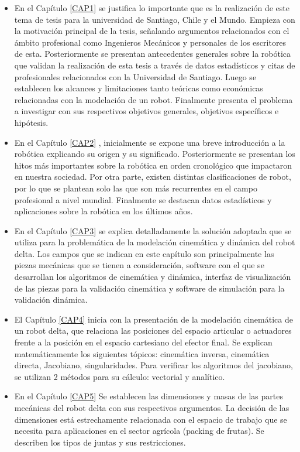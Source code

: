 \begin{itemize}
    \item {En el Capítulo \eqref{CAP1} se justifica lo importante que es la realización de este tema de tesis para la universidad de Santiago, Chile y el Mundo. Empieza con la motivación principal de la tesis, señalando argumentos relacionados con el ámbito profesional como Ingenieros Mecánicos y personales de los escritores de esta. Posteriormente se presentan antecedentes generales sobre la robótica que validan la realización de esta tesis a través de datos estadísticos y citas de profesionales relacionados con la Universidad de Santiago. Luego se establecen los alcances y limitaciones tanto teóricas como económicas relacionadas con la modelación de un robot. Finalmente presenta el problema a investigar con sus respectivos objetivos generales, objetivos específicos e hipótesis.}
    \item {En el Capítulo \eqref{CAP2} , inicialmente se expone una breve introducción a la robótica explicando su origen y su significado. Posteriormente se presentan los hitos más importantes sobre la robótica en orden cronológico que impactaron en nuestra sociedad. Por otra parte, existen distintas clasificaciones de robot, por lo que se plantean solo las que son más recurrentes en el campo profesional a nivel mundial. Finalmente se destacan datos estadísticos y aplicaciones sobre la robótica en los últimos años.}
    \item {En el Capítulo \eqref{CAP3} se explica detalladamente la solución adoptada que se utiliza para la problemática de la modelación cinemática y dinámica del robot delta. Los campos que se indican en este capítulo son principalmente las piezas mecánicas que se tienen a consideración, software con el que se desarrollan los algoritmos de cinemática y dinámica, interfaz de visualización de las piezas para la validación cinemática y software de simulación para la validación dinámica.}
    \item {El Capítulo \eqref{CAP4} inicia con la presentación de la modelación cinemática de un robot delta, que relaciona las posiciones del espacio articular o actuadores frente a la posición en el espacio cartesiano del efector final. Se explican matemáticamente los siguientes tópicos: cinemática inversa, cinemática directa, Jacobiano, singularidades. Para verificar los algoritmos del jacobiano, se utilizan 2 métodos para su cálculo: vectorial y analítico. }
    \item {En el Capítulo \eqref{CAP5} Se establecen las dimensiones y masas de las partes mecánicas del robot delta con sus respectivos argumentos. La decisión de las dimensiones está estrechamente relacionada con el espacio de trabajo que se necesita para aplicaciones en el sector agrícola (packing de frutas). Se describen los tipos de juntas y sus restricciones.}

\end{itemize}
